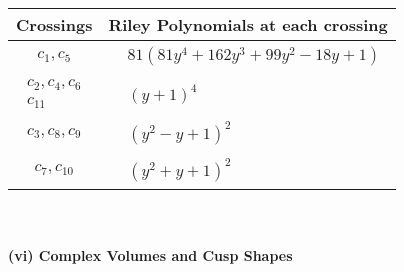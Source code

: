 \documentclass[1p]{elsarticle_modified}
\theoremstyle{definition}
\begin{document}
\begin{tabular}{m{50pt}|m{274pt}}
Crossings & \hspace{64pt}Riley Polynomials at each crossing \\
\hline $$\begin{aligned}c_{1},c_{5}\end{aligned}$$&$\begin{aligned}
&81(81 y^4+162 y^3+99 y^2-18 y+1)
\end{aligned}$\\
\hline $$\begin{aligned}c_{2},c_{4},c_{6}\\c_{11}\end{aligned}$$&$\begin{aligned}
&(y+1)^4
\end{aligned}$\\
\hline $$\begin{aligned}c_{3},c_{8},c_{9}\end{aligned}$$&$\begin{aligned}
&(y^2- y+1)^2
\end{aligned}$\\
\hline $$\begin{aligned}c_{7},c_{10}\end{aligned}$$&$\begin{aligned}
&(y^2+y+1)^2
\end{aligned}$\\
\hline
\end{tabular}\\~\\
\newpage\flushleft \textbf{(vi) Complex Volumes and Cusp Shapes}
\end{document}
